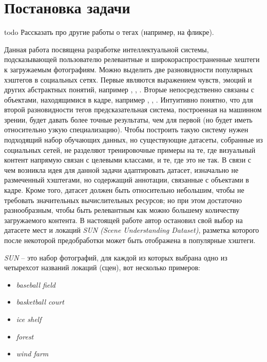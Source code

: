 \section{Постановка задачи}

todo Рассказать про другие работы о тегах (например, на фликре).

\indent
\indent
Данная работа посвящена разработке интеллектуальной системы, 
подсказывающей пользователю релевантные и широкораспространенные
хештеги к загружаемым фотографиям.
Можно выделить две разновидности популярных хэштегов в социальных сетях.
Первые являются выражением чувств, эмоций и других абстрактных понятий,
например , , . Вторые непосредственно
связаны с объектами, находящимися в кадре, например  
, , . 
Интуитивно понятно, что для второй разновидности
тегов предсказательная система, построенная на машинном зрении, будет
давать более точные результаты, чем для первой (но будет
иметь относительно узкую специализацию). Чтобы построить такую систему
нужен подходящий набор обучающих данных, но существующие датасеты, 
собранные из социальных сетей, не разделяют тренировочные примеры на те, 
где визуальный контент напрямую связан с целевыми классами, и те, где это не так.
В связи с чем возникла идея для данной задачи 
адаптировать датасет, изначально не размеченный
хэштегами, но содержащий аннотации, связанные с объектами
 в кадре. Кроме того, датасет должен быть относительно небольшим,
чтобы не требовать значительных 
вычислительных ресурсов; но при этом достаточно разнообразным, чтобы 
быть релевантным как можно большему количеству загружаемого контента.
В настоящей работе автор остановил свой выбор на датасете мест и локаций 
 \textit{SUN\cite{sundata} (Scene Understanding Dataset)}, 
 разметка которого после некоторой предобработки может быть отображена в популярные хэштеги.


\indent  
\textit{SUN} -- это набор фотографий, для каждой из которых выбрана одно
  из четырехсот названий локаций (сцен), вот несколько примеров:
  
  
\begin{itemize}
    \item \textit{baseball field}
    \item \textit{basketball court}
    \item \textit{ice shelf}
    \item \textit{forest}
    \item \textit{wind farm}
\end{itemize}


